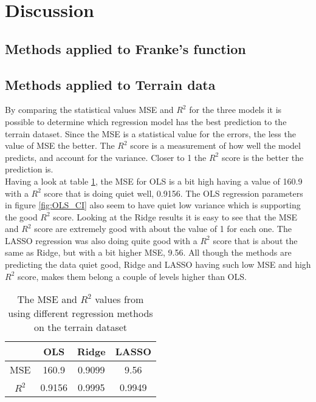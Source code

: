 \documentclass[../main.tex]{subfiles}
\begin{document}
\section{Discussion}\label{sec:discussion}
\subsection{Methods applied to Franke's function}

\subsection{Methods applied to Terrain data}
By comparing the statistical values MSE and $R^2$ for the three models it is possible to determine which regression model has the best prediction to the terrain dataset. Since the MSE is a statistical value for the errors, the less the value of MSE the better. The $R^2$ score is a measurement of how well the model predicts, and account for the variance. Closer to 1 the $R^2$ score is the better the prediction is.\\

Having a look at table \ref{tab:statistical_results}, the MSE for OLS is a bit high having a value of 160.9 with a $R^2$ score that is doing quiet well, 0.9156. The OLS regression parameters in figure \ref{fig:OLS_CI} also seem to have quiet low variance which is supporting the good $R^2$ score. Looking at the Ridge results it is easy to see that the MSE and $R^2$ score are extremely good with about the value of 1 for each one. The LASSO regression was also doing quite good with a $R^2$ score that is about the same as Ridge, but with a bit higher MSE, 9.56.  All though the methods are predicting the data quiet good, Ridge and LASSO having such low MSE and high $R^2$ score, makes them belong a couple of levels higher than OLS.

\begin{table}[H]
\begin{center}
\begin{tabular}{ |c|c|c|c| } 
 \hline
  & OLS & Ridge & LASSO \\ 
 \hline
 MSE & 160.9 & 0.9099 & 9.56\\
 \hline
 $R^2$ & 0.9156 & 0.9995 & 0.9949 \\ 
 \hline
\end{tabular}
\label{tab:statistical_results}
\caption{The MSE and $R^2$ values from using different regression methods on the terrain dataset}
\end{center}
\end{table}
\end{document}

